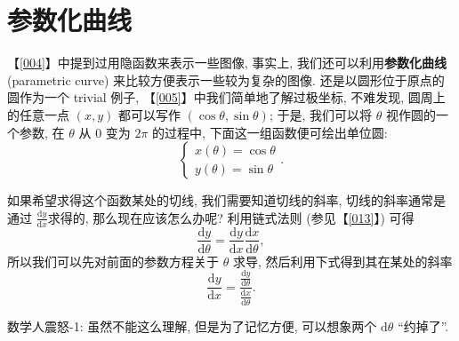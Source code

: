 \section{参数化曲线}\label{021}

【\ref{004}】中提到过用隐函数来表示一些图像, 事实上,
我们还可以利用\textbf{参数化曲线} (parametric curve)
来比较方便表示一些较为复杂的图像. 还是以圆形位于原点的圆作为一个 trivial
例子, 【\ref{005}】中我们简单地了解过极坐标, 不难发现, 圆周上的任意一点
\((x,y)\) 都可以写作 \((\cos\theta, \sin\theta)\); 于是, 我们可以将
\(\theta\) 视作圆的一个参数, 在 \(\theta\) 从 \(0\) 变为 \(2\pi\)
的过程中, 下面这一组函数便可绘出单位圆: \[
\begin{cases}
x(\theta)=\cos\theta\\
y(\theta)=\sin\theta
\end{cases}.
\]

如果希望求得这个函数某处的切线, 我们需要知道切线的斜率,
切线的斜率通常是通过 \(\frac{\mathrm{d}y}{\mathrm{d}x}\)求得的,
那么现在应该怎么办呢? 利用链式法则 (参见【\ref{013}】) 可得 \[
\frac{\mathrm{d}y}{\mathrm{d}\theta}=\frac{\mathrm{d}y}{\mathrm{d}x}\frac{\mathrm{d}x}{\mathrm{d}\theta},
\] 所以我们可以先对前面的参数方程关于 \(\theta\) 求导,
然后利用下式得到其在某处的斜率 \[
\frac{\mathrm{d}y}{\mathrm{d}x}=\frac{\frac{\mathrm{d}y}{\mathrm{d}\theta}}{\frac{\mathrm{d}x}{\mathrm{d}\theta}}.
\]

\begin{newquote}
数学人震怒-1: 虽然不能这么理解, 但是为了记忆方便, 可以想象两个
\(\mathrm{d}\theta\) ``约掉了''.
\end{newquote}

